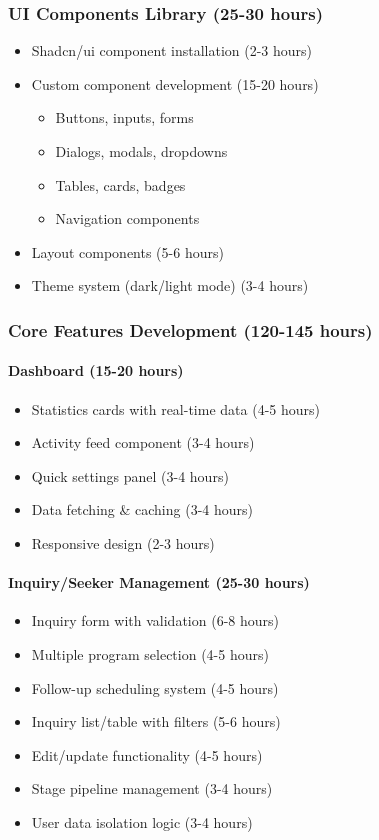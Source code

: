 \documentclass[11pt,a4paper]{article}
\begin{document}
\subsubsection{UI Components Library (25-30 hours)}
\begin{itemize}
    \item Shadcn/ui component installation (2-3 hours)
    \item Custom component development (15-20 hours)
    \begin{itemize}
        \item Buttons, inputs, forms
        \item Dialogs, modals, dropdowns
        \item Tables, cards, badges
        \item Navigation components
    \end{itemize}
    \item Layout components (5-6 hours)
    \item Theme system (dark/light mode) (3-4 hours)
\end{itemize}

\subsubsection{Core Features Development (120-145 hours)}

\paragraph{Dashboard (15-20 hours)}
\begin{itemize}
    \item Statistics cards with real-time data (4-5 hours)
    \item Activity feed component (3-4 hours)
    \item Quick settings panel (3-4 hours)
    \item Data fetching \& caching (3-4 hours)
    \item Responsive design (2-3 hours)
\end{itemize}

\paragraph{Inquiry/Seeker Management (25-30 hours)}
\begin{itemize}
    \item Inquiry form with validation (6-8 hours)
    \item Multiple program selection (4-5 hours)
    \item Follow-up scheduling system (4-5 hours)
    \item Inquiry list/table with filters (5-6 hours)
    \item Edit/update functionality (4-5 hours)
    \item Stage pipeline management (3-4 hours)
    \item User data isolation logic (3-4 hours)
\end{itemize}
\end{document}
